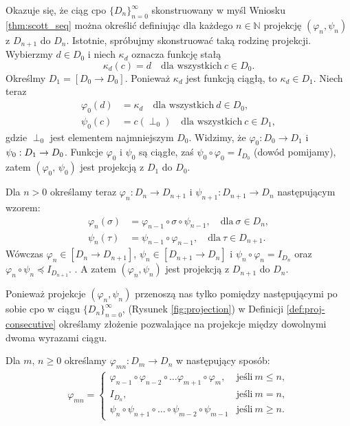   Okazuje się, że ciąg cpo \(\{D_n\}_{n=0}^\infty\) skonstruowany w myśl Wniosku \ref{thm:scott_seq} można określić definiując dla każdego \(n\in\mathbb{N}\) projekcję \((\varphi_n,\psi_n)\) z \(D_{n+1}\) do \(D_n\). Istotnie, spróbujmy skonstruować taką rodzinę projekcji. Wybierzmy \(d\in D_0\) i niech \(\kappa_d\) oznacza funkcję stałą 
  \[\kappa_d(c)=d\quad \text{dla wszystkich}\ c\in D_0.\]
  Określmy \(D_1=[D_0\to D_0]\). Ponieważ \(\kappa_d\) jest funkcją ciągłą, to \(\kappa_d\in D_1\). Niech teraz
  \begin{align*}
    \varphi_0 (d) &= \kappa_d  \quad \text{dla wszystkich}\ d\in D_0,\\
    \psi_0(c) &= c(\perp_0) \quad \text{dla wszystkich}\ c\in D_1,
  \end{align*}
gdzie \(\perp_0\) jest elementem najmniejszym \(D_0\). Widzimy, że \(\varphi_0: D_0 \to D_1\) i \(\psi_0:\nobreak D_1\to\nobreak D_0\). Funkcje \(\varphi_0\) i \(\psi_0\) są ciągłe, zaś \(\psi_0\circ\varphi_0 = I_{D_0}\) (dowód pomijamy), zatem \((\varphi_0,\,\psi_0)\) jest projekcją z \(D_1\) do \(D_0\).

Dla \(n>0\) określamy teraz \(\varphi_n : D_n \to D_{n+1}\) i \(\psi_{n+1}: D_{n+1}\to D_n\) następującym wzorem:
\begin{align*}
  \varphi_n(\sigma) &= \varphi_{n-1}\circ\sigma\circ\psi_{n-1},\quad \text{dla}\ \sigma\in D_n,\\ 
  \psi_n(\tau) &= \psi_{n-1}\circ\varphi_{n-1},\quad \text{dla}\ \tau \in D_{n+1}.
\end{align*}
Wówczas \(\varphi_n\in[D_n\to D_{n+1}]\), \(\psi_n\in[D_{n+1}\to D_n]\) i \(\psi_n\circ\varphi_n=I_{D_n}\) oraz \(\varphi_n\circ\psi_n\preceq I_{D_{n+1}}.\) \cite[Lemat 16.28]{Hindley:2008:LCI:1388400}. A zatem \((\varphi_n,\psi_n)\) jest projekcją z \(D_{n+1}\) do \(D_n\).

Ponieważ projekcje \((\varphi_n, \psi_n)\) przenoszą nas tylko pomiędzy następującymi po sobie cpo w ciągu \(\{D_n\}_{n=0}^\infty\), (Rysunek \ref{fig:projection}) w Definicji \ref{def:proj-consecutive} określamy złożenie pozwalające na projekcje między dowolnymi dwoma wyrazami ciągu.

\begin{definicja}\label{def:proj-consecutive}%
Dla \(m,\,n\geq 0\) określamy \(\varphi_{mn}:D_m \to D_n\) w następujący sposób:
\begin{align*}
\varphi_{mn} =
\begin{cases}
\varphi_{n-1} \circ \varphi_{n-2} \circ \dots \varphi_{m+1} \circ \varphi_m, & \text{jeśli}\ m\leq n,\\
I_{D_n}, & \text{jeśli}\ m=n,\\
\psi_n \circ \psi_{n+1} \circ \dots \circ \psi_{m-2}\circ \psi_{m-1} & \text{jeśli}\ m\geq n.
\end{cases}
\end{align*}
\end{definicja}


